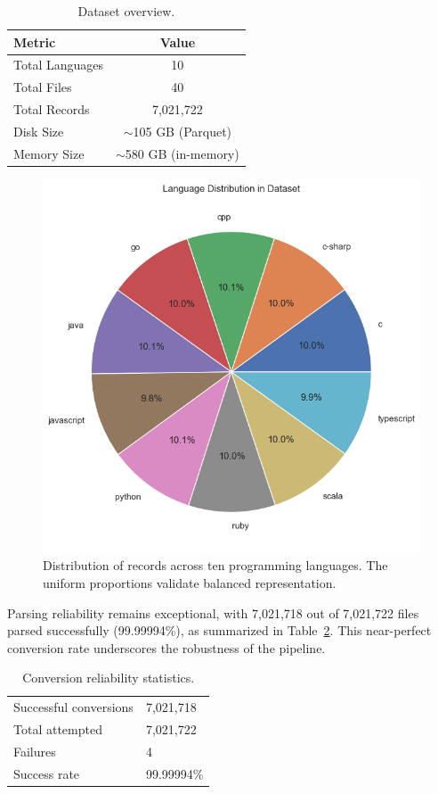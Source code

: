 \documentclass{article}
\begin{document}
\begin{table}[H]
\centering
\caption{Dataset overview.}
\label{tab:dataset-overview}
\begin{tabular}{lc}
\toprule
\textbf{Metric} & \textbf{Value} \\
\midrule
Total Languages & 10 \\
Total Files & 40 \\
Total Records & 7,021,722 \\
Disk Size & $\sim$105 GB (Parquet) \\
Memory Size & $\sim$580 GB (in-memory) \\
\bottomrule
\end{tabular}
\end{table}

\begin{figure}[H]
\centering
\includegraphics[width=0.55\linewidth]{pie_chart_language_distribution.png}
\caption{Distribution of records across ten programming languages. The uniform proportions validate balanced representation.}
\label{fig:pie-language}
\end{figure}

Parsing reliability remains exceptional, with 7,021,718 out of 7,021,722 files parsed successfully (99.99994\%), as summarized in Table~\ref{tab:conversion-stats}. This near-perfect conversion rate underscores the robustness of the pipeline.

\begin{table}[H]
\centering
\caption{Conversion reliability statistics.}
\label{tab:conversion-stats}
\begin{tabular}{l l}
\toprule
Successful conversions & 7,021,718 \\
Total attempted & 7,021,722 \\
Failures & 4 \\
Success rate & 99.99994\% \\
\bottomrule
\end{tabular}
\end{table}
\end{document}
